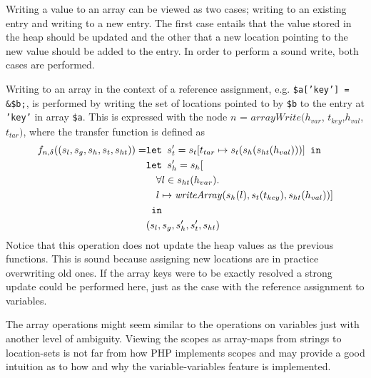 Writing a value to an array can be viewed as two cases; writing to an existing entry and writing to a new entry. The first case entails that the value stored in the heap should be updated and the other that a new location pointing to the new value should be added to the entry. In order to perform a sound write, both cases are performed. 


Writing to an array in the context of a reference assignment, e.g. \texttt{\$a['key'] = \&\$b;}, is performed by writing the set of locations pointed to by \texttt{\$b} to the entry at \texttt{'key'} in array \texttt{\$a}.  This is expressed with the node $n$ = $\mathit{arrayWrite}(h_{var}$, $t_{key}$,$h_{val}$,$t_{tar})$, where the transfer function is defined as 
\begin{align}
    f_{n,\delta}((s_l, s_g, s_h, s_t, s_{ht})) = &\texttt{let } s_t' = s_t[t_{tar}\mapsto s_t(s_h(s_{ht}(h_{val})))] \texttt{ in }\notag\\
                              &\texttt{let } s_h' = s_h[\notag\\
                              &\quad \forall l \in s_{ht}(h_{var}).\notag\\
                              &\quad l\mapsto \mathit{writeArray}(s_h(l), s_t(t_{key}), s_{ht}(h_{val}))]\notag\\
                              & \texttt{ in }\notag\\
                              &(s_l, s_g, s_h', s_t', s_{ht})
\end{align}
Notice that this operation does not update the heap values as the previous functions. This is sound because assigning new locations are in practice overwriting old ones. If the array keys were to be exactly resolved a strong update could be performed here, just as the case with the reference assignment to variables.


The array operations might seem similar to the operations on variables just with another level of ambiguity. Viewing the scopes as array-maps from strings to location-sets is not far from how PHP implements scopes and may provide a good intuition as to how and why the variable-variables feature is implemented. 

